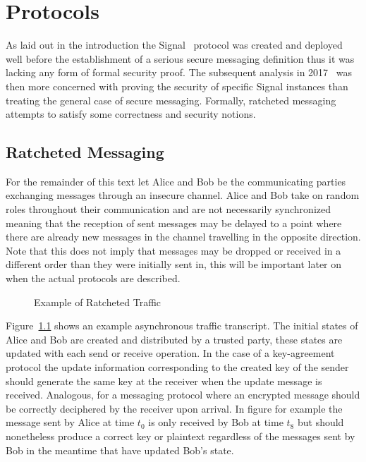 \documentclass[11pt,a4paper,twoside,openright,bibliography=totoc]{scrbook}
\begin{document}
\chapter{Protocols}
\label{chap:protocols}

As laid out in the introduction the Signal~\cite{perrin2016double}
protocol was created and deployed well before the establishment of a
serious secure messaging definition thus it was lacking any form of
formal security proof. The subsequent analysis in 2017~\cite{cohn2017formal}
was then more concerned with proving the security of specific Signal
instances than treating the general case of secure
messaging. Formally, ratcheted messaging attempts to satisfy some
correctness and security notions.

\section{Ratcheted Messaging}
\label{sec:ratcheted-messaging}

For the remainder of this text let Alice and Bob be the communicating
parties exchanging messages through an insecure channel. Alice and Bob take on random
roles throughout their communication and are not necessarily
synchronized meaning that the reception of sent messages may be
delayed to a point where there are already new messages in the channel
travelling in the opposite direction. Note that this does not imply
that messages may be dropped or received in a different order than
they were initially sent in, this will be important later on when
the actual protocols are described.
\begin{figure}[ht]
  \centering
   
  \caption{Example of Ratcheted Traffic}
  \label{fig:traffic}
\end{figure}
Figure~\ref{fig:traffic} shows an example asynchronous traffic
transcript. The initial states of Alice and Bob are created and
distributed by a trusted party, these states are updated with each
send or receive operation. In the case of a key-agreement protocol the
update information corresponding to the created key of the sender
should generate the same key at the receiver when the update message
is received. Analogous, for a messaging protocol where an encrypted
message should be correctly deciphered by the receiver upon
arrival. In figure for example the message sent by Alice at time $t_0$
is only received by Bob at time $t_8$ but should nonetheless produce a
correct key or plaintext regardless of the messages sent by Bob in the
meantime that have updated Bob's state.
\end{document}

